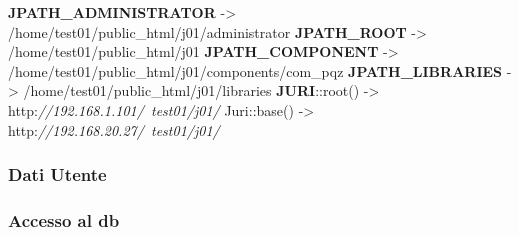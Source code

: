 \documentclass[]{article}
\newenvironment{Shaded}{}{}
\newcommand{\KeywordTok}[1]{\textcolor[rgb]{0.00,0.44,0.13}{\textbf{{#1}}}}
\newcommand{\StringTok}[1]{\textcolor[rgb]{0.25,0.44,0.63}{{#1}}}
\newcommand{\CommentTok}[1]{\textcolor[rgb]{0.38,0.63,0.69}{\textit{{#1}}}}
\newcommand{\OtherTok}[1]{\textcolor[rgb]{0.00,0.44,0.13}{{#1}}}
\newcommand{\FunctionTok}[1]{\textcolor[rgb]{0.02,0.16,0.49}{{#1}}}
\newcommand{\NormalTok}[1]{{#1}}
\begin{document}
\begin{Shaded}
\begin{Highlighting}[]
\KeywordTok{JPATH_ADMINISTRATOR}     \NormalTok{->  /home/test01/public_html/j01/administrator}
\KeywordTok{JPATH_ROOT}              \NormalTok{->  /home/test01/public_html/j01}
\KeywordTok{JPATH_COMPONENT}         \NormalTok{->  /home/test01/public_html/j01/components/com_pqz}
\KeywordTok{JPATH_LIBRARIES}         \NormalTok{->  /home/test01/public_html/j01/libraries}
\KeywordTok{JURI}\NormalTok{::root}\OtherTok{()}            \NormalTok{->  http:}\CommentTok{//192.168.1.101/~test01/j01/}
\NormalTok{Juri::base}\OtherTok{()}            \NormalTok{->  http:}\CommentTok{//192.168.20.27/~test01/j01/ }
\end{Highlighting}
\end{Shaded}

\subsubsection{Dati Utente}\label{dati-utente}

\begin{Shaded}
\end{Shaded}

\subsubsection{Accesso al db}\label{accesso-al-db}
\end{document}
